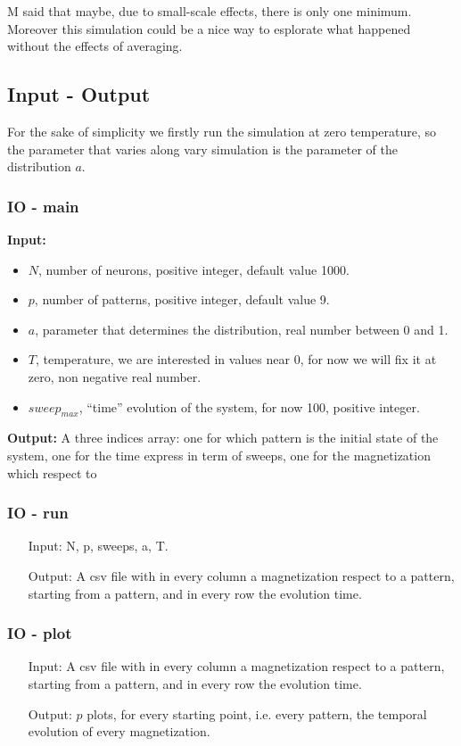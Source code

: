 \documentclass[a4paper,10pt]{article}
\begin{document}
M said that maybe, due to small-scale effects, there is only one minimum. Moreover this simulation could be a nice way to esplorate what happened without the effects of averaging.

\subsection{Input - Output}

For the sake of simplicity we firstly run the simulation at zero temperature, so the parameter that varies along vary simulation is the parameter of the distribution $a$.


\subsubsection{IO - main}
\textbf{Input:}
\begin{itemize}
\item $N$, number of neurons, positive integer, default value 1000.
\item $p$, number of patterns, positive integer, default value 9.
\item $a$, parameter that determines the distribution, real number between 0 and 1.
\item $T$, temperature, we are interested in values near 0, for now we will fix it at zero, non negative real number.
\item $sweep_{max}$, ``time'' evolution of the system, for now 100, positive integer.
\end{itemize}
\textbf{Output:}
A three indices array: one for which pattern is the initial state of the system, one for the time express in term of sweeps, one for the magnetization which respect to

\subsubsection{IO - run}
\begin{itemize}
 \item[Input:] N, p, sweeps, a, T.
 \item[Output:] A csv file with in every column a magnetization respect to a pattern, starting from a pattern, and in every row the evolution time.
\end{itemize}

\subsubsection{IO - plot}
\begin{itemize}
 \item[Input:] A csv file with in every column a magnetization respect to a pattern, starting from a pattern, and in every row the evolution time.
 \item[Output:] $p$ plots, for every starting point, i.e. every pattern, the temporal evolution of every magnetization.
\end{itemize}



\printbibliography
\end{document}

